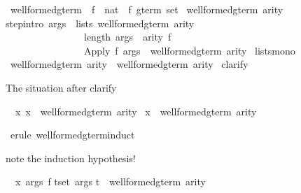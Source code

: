 \begin{isabellebody}
\isanewline
\isanewline
{}\ well{\isacharunderscore}formed{\isacharunderscore}gterm{\isacharprime}\ {\isacharcolon}{\isacharcolon}\ {\isachardoublequote}{\isacharparenleft}{\isacharprime}f\ {\isasymRightarrow}\ nat{\isacharparenright}\ {\isasymRightarrow}\ {\isacharprime}f\ gterm\ set{\isachardoublequote}\isanewline
{}\ {\isachardoublequote}well{\isacharunderscore}formed{\isacharunderscore}gterm{\isacharprime}\ arity{\isachardoublequote}\isanewline
{}\isanewline
step{\isacharbrackleft}intro{\isacharbang}{\isacharbrackright}{\isacharcolon}\ {\isachardoublequote}{\isasymlbrakk}args\ {\isasymin}\ lists\ {\isacharparenleft}well{\isacharunderscore}formed{\isacharunderscore}gterm{\isacharprime}\ arity{\isacharparenright}{\isacharsemicolon}\ \ \isanewline
\ \ \ \ \ \ \ \ \ \ \ \ \ \ \ \ length\ args\ {\isacharequal}\ arity\ f{\isasymrbrakk}\isanewline
\ \ \ \ \ \ \ \ \ \ \ \ \ \ \ {\isasymLongrightarrow}\ {\isacharparenleft}Apply\ f\ args{\isacharparenright}\ {\isasymin}\ well{\isacharunderscore}formed{\isacharunderscore}gterm{\isacharprime}\ arity{\isachardoublequote}\isanewline
{}\ lists{\isacharunderscore}mono\isanewline
\isanewline
{}\ {\isachardoublequote}well{\isacharunderscore}formed{\isacharunderscore}gterm\ arity\ {\isasymsubseteq}\ well{\isacharunderscore}formed{\isacharunderscore}gterm{\isacharprime}\ arity{\isachardoublequote}\isanewline
{}\ clarify%
\begin{isamarkuptxt}%
The situation after clarify
\begin{isabelle}%
\ {}{\isachardot}\ {\isasymAnd}x{\isachardot}\ x\ {\isasymin}\ well{\isacharunderscore}formed{\isacharunderscore}gterm\ arity\ {\isasymLongrightarrow}\isanewline
{}x\ {\isasymin}\ well{\isacharunderscore}formed{\isacharunderscore}gterm{\isacharprime}\ arity%
\end{isabelle}%
\end{isamarkuptxt}%
\ {\isacharparenleft}erule\ well{\isacharunderscore}formed{\isacharunderscore}gterm{\isachardot}induct{\isacharparenright}%
\begin{isamarkuptxt}%
note the induction hypothesis!
\begin{isabelle}%
\ {}{\isachardot}\ {\isasymAnd}x\ args\ f{\isachardot}\isanewline
{}t{\isasymin}set\ args{\isachardot}\isanewline
{}t\ {\isasymin}\ well{\isacharunderscore}formed{\isacharunderscore}gterm\ arity\ {\isasymand}\isanewline

\end{isabelle}
\end{isamarkuptxt}
\end{isabellebody}
